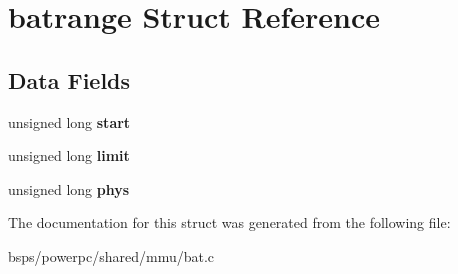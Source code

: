 \hypertarget{structbatrange}{}\section{batrange Struct Reference}
\label{structbatrange}
\subsection*{Data Fields}
\begin{DoxyCompactItemize}
\item 
\mbox{\label{structbatrange_a08f99eac3d921935a8b8218be5435d60}} 
unsigned long {\bfseries start}
\item 
\mbox{\label{structbatrange_a2d8ed88526a7ac45572050bac76300d6}} 
unsigned long {\bfseries limit}
\item 
\mbox{\label{structbatrange_a8e275c7c88c4f8b3384245df0d585d84}} 
unsigned long {\bfseries phys}
\end{DoxyCompactItemize}


The documentation for this struct was generated from the following file\+:\begin{DoxyCompactItemize}
\item 
bsps/powerpc/shared/mmu/bat.\+c\end{DoxyCompactItemize}
